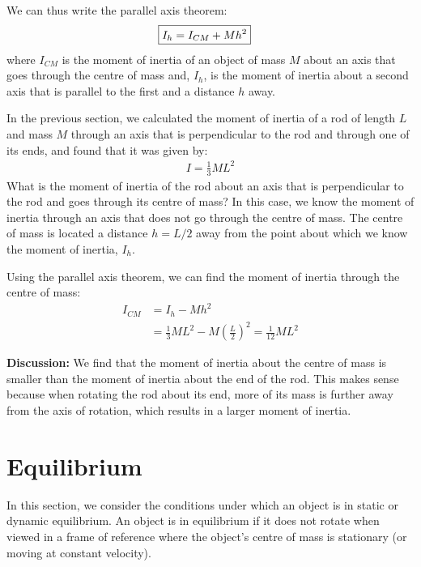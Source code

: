 We can thus write the parallel axis theorem:
\begin{align}
\Aboxed{I_h = I_{CM} + Mh^2}
\end{align}
where $I_{CM}$ is the moment of inertia of an object of mass $M$ about an axis that goes through the centre of mass and, $I_h$, is the moment of inertia about a second axis that is parallel to the first and a distance $h$ away.

\begin{example}{In the previous section, we calculated the moment of inertia of a rod of length $L$ and mass $M$ through an axis that is perpendicular to the rod and through one of its ends, and found that it was given by:
\begin{align*}
I=\frac{1}{3}ML^2
\end{align*}
What is the moment of inertia of the rod about an axis that is perpendicular to the rod and goes through its centre of mass?}
In this case, we know the moment of inertia through an axis that does not go through the centre of mass. The centre of mass is located a distance $h=L/2$ away from the point about which we know the moment of inertia, $I_h$. 

Using the parallel axis theorem, we can find the moment of inertia through the centre of mass:
\begin{align*}
I_{CM} &= I_h - Mh^2\\
&=\frac{1}{3}ML^2 - M \left( \frac{L}{2}\right)^2 = \frac{1}{12}ML^2
\end{align*}

\textbf{Discussion: }We find that the moment of inertia about the centre of mass is smaller than the moment of inertia about the end of the rod. This makes sense because when rotating the rod about its end, more of its mass is further away from the axis of rotation, which results in a larger moment of inertia.
\end{example}


\section{Equilibrium}
In this section, we consider the conditions under which an object is in static or dynamic equilibrium. An object is in equilibrium if it does not rotate when viewed in a frame of reference where the object's centre of mass is stationary (or moving at constant velocity).
